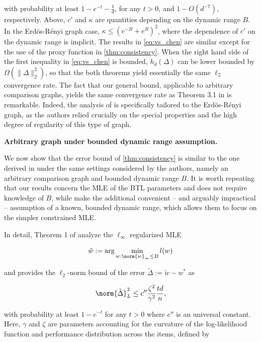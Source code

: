 with probability at least $1-e^{-t}-\frac{1}{d}$, for any $t > 0$, and $1-O(d^{-7})$, respectively. Above, $c'$ and $\kappa$ are quantities depending on the dynamic range $B$. In the Erd\"os-R\'enyi graph case, $\kappa \leq (e^{-B} + e^{B})^2$, where the dependence of $c'$ on the dynamic range is implicit. The results in \ref{eq:vs_chen} are similar except for the use of the proxy function in \ref{thm:consistency}. When the right hand side of the first inequality in \ref{eq:vs_chen} is bounded, $h_d(\Delta)$ can be lower bounded by $\Omega(\|\Delta\|_2^2) $, so that the both theorems yield essentially the same $\ell_2$ convergence rate. The fact that our general bound, applicable to arbitrary comparison graphs, yields the same convergence rate as Theorem 3.1 in \citet{chen2019spectralregmletopk} is remarkable. Indeed, the analysis of \citet{chen2019spectralregmletopk} is specifically tailored to the Erd\"os-R\'enyi graph, as the authors relied crucially on the special properties and the high degree of regularity of  this type of graph. 

 {\bf Arbitrary graph  under bounded dynamic range assumption.}

We now show that the error bound of \ref{thm:consistency} is similar to the one derived in \citet{shah2016estimation} under the same settings considered by the authors, namely an arbitrary comparison graph and bounded dynamic range $B$. It is worth repeating that our results concern the MLE of the BTL parameters and does not require knowledge of $B$, while \citet{shah2016estimation} make the additional convenient -- and arguably impractical -- assumption of a known, bounded dynamic range, which allows them to focus on the simpler constrained MLE. 

In detail, Theorem 1 of \citet{shah2016estimation} analyze the $\ell_\infty$ regularized MLE

\begin{equation}
    \tilde{w} := \arg\min_{w:\norm{w}_\infty \leq B} l(w)
\end{equation}

and provides the $\ell_2$-norm bound of the error $\tilde{\Delta} := \tilde{w}-w^*$ as

\begin{equation} \label{eq:ell_2_shah}
    \norm{\tilde{\Delta}}_{L}^2 \leq c'' \frac{\zeta^2}{\gamma^2}\frac{td}{n},
\end{equation}

with probability at least $1-e^{-t}$ for any $t > 0 $ where $c''$ is an universal constant. Here, $\gamma$ and $\zeta$ are parameters accounting for the curvature of the log-likelihood function and performance distribution across the items, defined by

